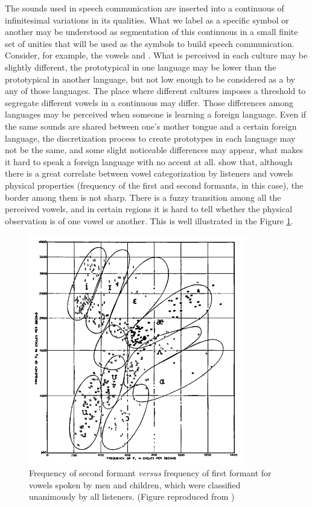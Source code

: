 The sounds used in speech communication are inserted into a continuous of infinitesimal variations in its qualities. What we label as a specific symbol or another may be understood as segmentation of this continuous in a small finite set of unities that will be used as the symbols to build speech communication. Consider, for example, the vowels \textipa{[e]} and \textipa{[E]}. What is perceived in each culture may be slightly different, the prototypical \textipa{[e]} in one language may be lower than the prototypical \textipa{[e]} in another language, but not low enough to be considered as a \textipa{[E]} by any of those languages. The place where different cultures imposes a threshold to segregate different vowels in a continuous may differ. Those differences among languages may be perceived when someone is learning a foreign language. Even if the same sounds are shared between one's mother tongue and a certain foreign language, the discretization process to create prototypes in each language may not be the same, and some slight noticeable differences may appear, what makes it hard to speak a foreign language with no accent at all. \cite{peterson} show that, although there is a great correlate between vowel categorization by listeners and vowels physical properties (frequency of the first and second formants, in this case), the border among them is not sharp. There is a fuzzy transition among all the perceived vowels, and in certain regions it is hard to tell whether the physical observation is of one vowel or another. This is well illustrated in the Figure \ref{fig:vowelsF1F2}.

\begin{figure}[h!]
\centering
\includegraphics[width=0.85\textwidth]{images/vowelsF1F2.png}
\caption{Frequency of second formant \textit{versus} frequency of first formant for vowels spoken by men and children, which were classified unanimously by all listeners. (Figure reproduced from \citep{peterson})}
\label{fig:vowelsF1F2}
\end{figure}  

